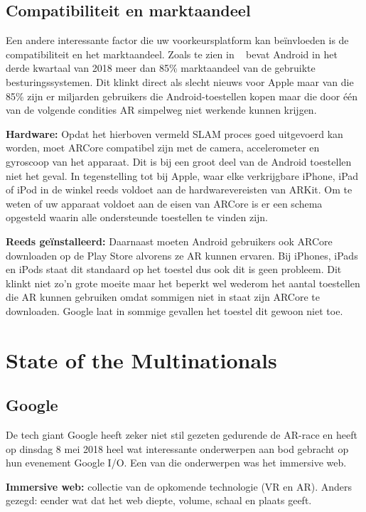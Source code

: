 \subsection{Compatibiliteit en marktaandeel}

Een andere interessante factor die uw voorkeursplatform kan beïnvloeden is de compatibiliteit en het marktaandeel. Zoals te zien in ~\textcite{IDC2018} bevat Android in het derde kwartaal van 2018 meer dan 85\% marktaandeel van de gebruikte besturingssystemen. Dit klinkt direct als slecht nieuws voor Apple maar van die 85\% zijn er miljarden gebruikers die Android-toestellen kopen maar die door één van de volgende condities AR simpelweg niet werkende kunnen krijgen. 

\textbf{Hardware:}
Opdat het hierboven vermeld SLAM proces goed uitgevoerd kan worden, moet ARCore compatibel zijn met de camera, accelerometer en gyroscoop van het apparaat. Dit is bij een groot deel van de Android toestellen niet het geval. In tegenstelling tot bij Apple, waar elke verkrijgbare iPhone, iPad of iPod in de winkel reeds voldoet aan de hardwarevereisten van ARKit. Om te weten of uw apparaat voldoet aan de eisen van ARCore is er een schema opgesteld waarin alle ondersteunde toestellen te vinden zijn. ~\autocite{GoogleDevices2019}

\textbf{Reeds geïnstalleerd:}
Daarnaast moeten Android gebruikers ook ARCore downloaden op de Play Store alvorens ze AR kunnen ervaren. Bij iPhones, iPads en iPods staat dit standaard op het toestel dus ook dit is geen probleem. Dit klinkt niet zo'n grote moeite maar het beperkt wel wederom het aantal toestellen die AR kunnen gebruiken omdat sommigen niet in staat zijn ARCore te downloaden. Google laat in sommige gevallen het toestel dit gewoon niet toe. 
 
\section{State of the Multinationals}
\label{sec:state-of-the-multinationals}
  

\subsection{Google}
De tech giant Google heeft zeker niet stil gezeten gedurende de AR-race en heeft op dinsdag 8 mei 2018 heel wat interessante onderwerpen aan bod gebracht op hun evenement Google I/O. Een van die onderwerpen was het immersive web.

\textbf{Immersive web:} 
collectie van de opkomende technologie (VR en AR). Anders gezegd: eender wat dat het web diepte, volume, schaal en plaats geeft.


